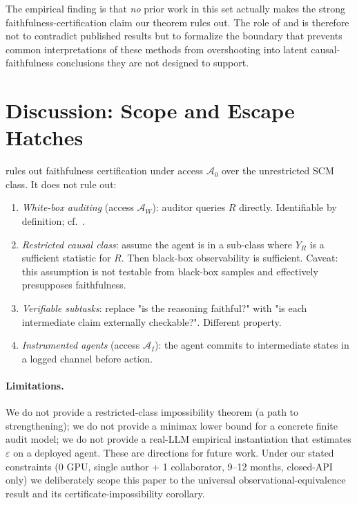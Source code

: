 \documentclass{article}
\theoremstyle{plain}
\theoremstyle{definition}
\theoremstyle{remark}
\begin{document}
The empirical finding is that \emph{no} prior work in this set actually makes
the strong faithfulness-certification claim our theorem rules out. The role of
 and  is therefore not to
contradict published results but to formalize the boundary that prevents
common interpretations of these methods from overshooting into latent
causal-faithfulness conclusions they are not designed to support.

\section{Discussion: Scope and Escape Hatches}\label{sec:discussion}

 rules out faithfulness certification under access
$\mathcal{A}_0$ over the unrestricted SCM class. It does not rule out:
\begin{enumerate}
  \item \emph{White-box auditing} (access $\mathcal{A}_W$): auditor queries
    $R$ directly. Identifiable by definition; cf.\ \citet{geiger2022inducing,geiger2023causal}.
  \item \emph{Restricted causal class}: assume the agent is in a sub-class
    where $Y_R$ is a sufficient statistic for $R$. Then black-box observability
    is sufficient. Caveat: this assumption is not testable from black-box
    samples and effectively presupposes faithfulness.
  \item \emph{Verifiable subtasks}: replace "is the reasoning faithful?" with
    "is each intermediate claim externally checkable?". Different property.
  \item \emph{Instrumented agents} (access $\mathcal{A}_I$): the agent commits
    to intermediate states in a logged channel before action.
\end{enumerate}

\paragraph{Limitations.}
We do not provide a restricted-class impossibility theorem (a path to
strengthening); we do not provide a minimax lower bound for a concrete finite
audit model; we do not provide a real-LLM empirical instantiation that
estimates $\varepsilon$ on a deployed agent. These are directions for future
work. Under our stated constraints (0 GPU, single author + 1 collaborator,
9--12 months, closed-API only) we deliberately scope this paper to the
universal observational-equivalence result and its certificate-impossibility
corollary.
\end{document}

